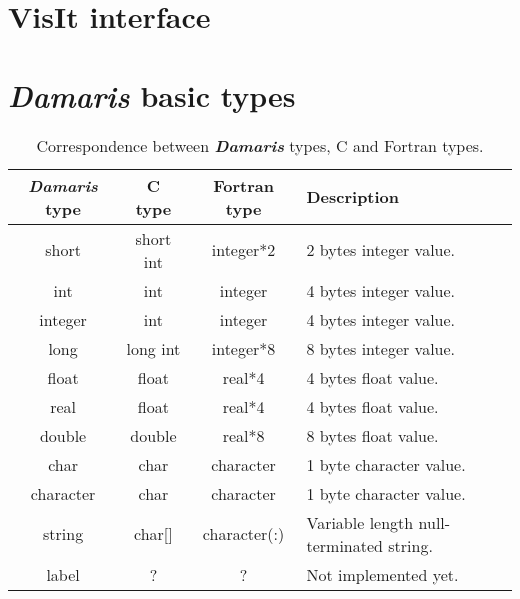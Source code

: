 \documentclass[11pt]{report}
\newcommand{\Damaris}{\emph{\textbf{Damaris}}}
\begin{document}
%


\chapter{VisIt interface}\label{chap:VisIt}




\appendix
\chapter{\Damaris{} basic types}\label{sec:types}

\begin{table}[h]
\centering
   \begin{tabular}{|c|c|c|l|}
      \hline
      \Damaris{} type & C type & Fortran type & Description \\
      \hline
short & short int & integer*2 &
                    2 bytes integer value.\\
int & int & integer &
                    4 bytes integer value.\\
integer & int & integer &
                    4 bytes integer value.\\
long & long int & integer*8 &
                    8 bytes integer value.\\
float & float & real*4 &
                    4 bytes float value.\\
real & float & real*4 &
                    4 bytes float value.\\
double & double & real*8 &
                    8 bytes float value.\\
char & char & character &
                    1 byte character value.\\
character & char & character &
                    1 byte character value.\\
string & char[] & character(:) &
                    Variable length null-terminated string.\\
label & ? & ? &
                    Not implemented yet.\\
                    \hline
   \end{tabular}
   \caption{Correspondence between \Damaris{} types, C and Fortran types.}
\end{table}

\printindex
\end{document}
